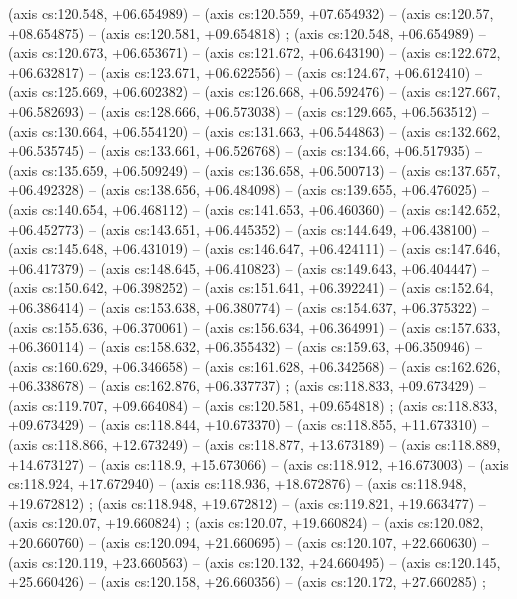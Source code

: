     (axis cs:120.548,    +06.654989) --  (axis cs:120.559,    +07.654932) --  (axis cs:120.57,    +08.654875) --  (axis cs:120.581,    +09.654818) ;
    (axis cs:120.548,    +06.654989) --  (axis cs:120.673,    +06.653671) --  (axis cs:121.672,    +06.643190) --  (axis cs:122.672,    +06.632817) --  (axis cs:123.671,    +06.622556) --  (axis cs:124.67,    +06.612410) --  (axis cs:125.669,    +06.602382) --  (axis cs:126.668,    +06.592476) --  (axis cs:127.667,    +06.582693) --  (axis cs:128.666,    +06.573038) --  (axis cs:129.665,    +06.563512) --  (axis cs:130.664,    +06.554120) --  (axis cs:131.663,    +06.544863) --  (axis cs:132.662,    +06.535745) --  (axis cs:133.661,    +06.526768) --  (axis cs:134.66,    +06.517935) --  (axis cs:135.659,    +06.509249) --  (axis cs:136.658,    +06.500713) --  (axis cs:137.657,    +06.492328) --  (axis cs:138.656,    +06.484098) --  (axis cs:139.655,    +06.476025) --  (axis cs:140.654,    +06.468112) --  (axis cs:141.653,    +06.460360) --  (axis cs:142.652,    +06.452773) --  (axis cs:143.651,    +06.445352) --  (axis cs:144.649,    +06.438100) --  (axis cs:145.648,    +06.431019) --  (axis cs:146.647,    +06.424111) --  (axis cs:147.646,    +06.417379) --  (axis cs:148.645,    +06.410823) --  (axis cs:149.643,    +06.404447) --  (axis cs:150.642,    +06.398252) --  (axis cs:151.641,    +06.392241) --  (axis cs:152.64,    +06.386414) --  (axis cs:153.638,    +06.380774) --  (axis cs:154.637,    +06.375322) --  (axis cs:155.636,    +06.370061) --  (axis cs:156.634,    +06.364991) --  (axis cs:157.633,    +06.360114) --  (axis cs:158.632,    +06.355432) --  (axis cs:159.63,    +06.350946) --  (axis cs:160.629,    +06.346658) --  (axis cs:161.628,    +06.342568) --  (axis cs:162.626,    +06.338678) --  (axis cs:162.876,    +06.337737) ;
    (axis cs:118.833,    +09.673429) --  (axis cs:119.707,    +09.664084) --  (axis cs:120.581,    +09.654818) ;
    (axis cs:118.833,    +09.673429) --  (axis cs:118.844,    +10.673370) --  (axis cs:118.855,    +11.673310) --  (axis cs:118.866,    +12.673249) --  (axis cs:118.877,    +13.673189) --  (axis cs:118.889,    +14.673127) --  (axis cs:118.9,    +15.673066) --  (axis cs:118.912,    +16.673003) --  (axis cs:118.924,    +17.672940) --  (axis cs:118.936,    +18.672876) --  (axis cs:118.948,    +19.672812) ;
    (axis cs:118.948,    +19.672812) --  (axis cs:119.821,    +19.663477) --  (axis cs:120.07,    +19.660824) ;
    (axis cs:120.07,    +19.660824) --  (axis cs:120.082,    +20.660760) --  (axis cs:120.094,    +21.660695) --  (axis cs:120.107,    +22.660630) --  (axis cs:120.119,    +23.660563) --  (axis cs:120.132,    +24.660495) --  (axis cs:120.145,    +25.660426) --  (axis cs:120.158,    +26.660356) --  (axis cs:120.172,    +27.660285) ;
